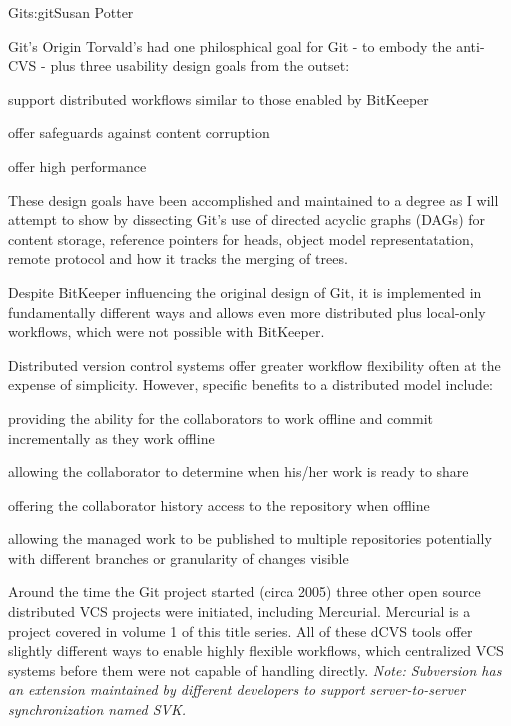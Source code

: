 \begin{aosachapter}{Git}{s:git}{Susan Potter}
\begin{aosasect1}{Git's Origin}
Torvald's had one philosphical goal for Git - to embody the anti-CVS - plus
three usability design goals from the outset:
\begin{aosaitemize}
  \item support distributed workflows similar to those enabled by BitKeeper
  \item offer safeguards against content corruption
  \item offer high performance
\end{aosaitemize}

These design goals have been accomplished and maintained to a degree as I
will attempt to show by dissecting Git's use of directed acyclic graphs
(DAGs) for content storage, reference pointers for heads, object model
representatation, remote protocol and how it tracks the merging of trees.

Despite BitKeeper influencing the original design of Git, it is implemented
in fundamentally different ways and allows even more distributed plus
local-only workflows, which were not possible with BitKeeper.

Distributed version control systems offer greater workflow flexibility often
at the expense of simplicity. However, specific benefits to a distributed
model include:
\begin{aosaitemize}
  \item providing the ability for the collaborators to work offline and
  commit incrementally as they work offline
  \item allowing the collaborator to determine when his/her work is
  ready to share
  \item offering the collaborator history access to the repository when
  offline
  \item allowing the managed work to be published to multiple repositories
  potentially with different branches or granularity of changes visible
\end{aosaitemize}

Around the time the Git project started (circa 2005) three other open source
distributed VCS projects were initiated, including Mercurial. Mercurial is a
project covered in volume 1 of this title series. All of these dCVS tools
offer slightly different ways to enable highly flexible workflows, which
centralized VCS systems before them were not capable of handling directly.
\emph{Note: Subversion has an extension maintained by different developers
to support server-to-server synchronization named SVK.}


\end{aosasect1}
\end{aosachapter}
